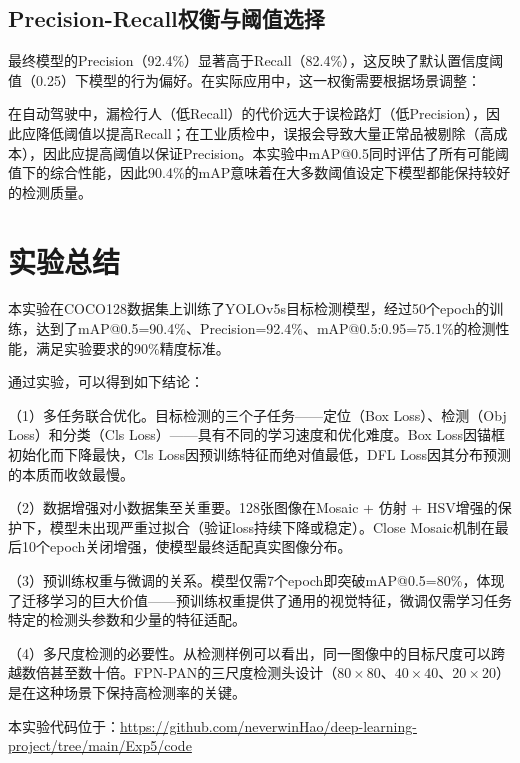 \documentclass[12pt,a4paper]{article}
\begin{document}
\subsection{Precision-Recall权衡与阈值选择}

最终模型的Precision（92.4\%）显著高于Recall（82.4\%），这反映了默认置信度阈值（0.25）下模型的行为偏好。在实际应用中，这一权衡需要根据场景调整：

在自动驾驶中，漏检行人（低Recall）的代价远大于误检路灯（低Precision），因此应降低阈值以提高Recall；在工业质检中，误报会导致大量正常品被剔除（高成本），因此应提高阈值以保证Precision。本实验中mAP@0.5同时评估了所有可能阈值下的综合性能，因此90.4\%的mAP意味着在大多数阈值设定下模型都能保持较好的检测质量。

\section{实验总结}

本实验在COCO128数据集上训练了YOLOv5s目标检测模型，经过50个epoch的训练，达到了mAP@0.5=90.4\%、Precision=92.4\%、mAP@0.5:0.95=75.1\%的检测性能，满足实验要求的90\%精度标准。

通过实验，可以得到如下结论：

（1）多任务联合优化。目标检测的三个子任务——定位（Box Loss）、检测（Obj Loss）和分类（Cls Loss）——具有不同的学习速度和优化难度。Box Loss因锚框初始化而下降最快，Cls Loss因预训练特征而绝对值最低，DFL Loss因其分布预测的本质而收敛最慢。

（2）数据增强对小数据集至关重要。128张图像在Mosaic + 仿射 + HSV增强的保护下，模型未出现严重过拟合（验证loss持续下降或稳定）。Close Mosaic机制在最后10个epoch关闭增强，使模型最终适配真实图像分布。

（3）预训练权重与微调的关系。模型仅需7个epoch即突破mAP@0.5=80\%，体现了迁移学习的巨大价值——预训练权重提供了通用的视觉特征，微调仅需学习任务特定的检测头参数和少量的特征适配。

（4）多尺度检测的必要性。从检测样例可以看出，同一图像中的目标尺度可以跨越数倍甚至数十倍。FPN-PAN的三尺度检测头设计（$80\times80$、$40\times40$、$20\times20$）是在这种场景下保持高检测率的关键。

本实验代码位于：\url{https://github.com/neverwinHao/deep-learning-project/tree/main/Exp5/code}
\end{document}
